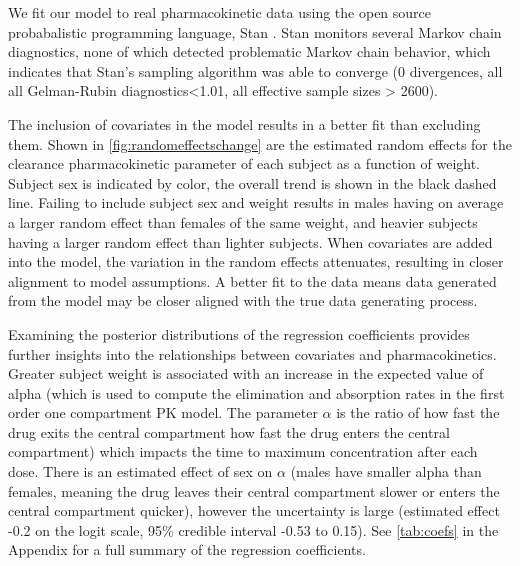 We fit our model to real pharmacokinetic data using the open source probabalistic programming language, Stan \cite{gelman2015stan}.  Stan monitors several Markov chain diagnostics, none of which detected problematic Markov chain behavior, which indicates that Stan’s sampling algorithm was able to converge (0 divergences, all all Gelman-Rubin diagnostics<1.01, all effective sample sizes  > 2600).  

The inclusion of covariates in the model results in a better fit than excluding them. Shown in \cref{fig:randomeffectschange} are the estimated random effects for the clearance pharmacokinetic parameter of each subject as a function of weight.  Subject sex is indicated by color, the overall trend is shown in the black dashed line.  Failing to include subject sex and weight results in males having on average a larger random effect than females of the same weight, and heavier subjects having a larger random effect than lighter subjects.  When covariates are added into the model, the variation in the random effects attenuates, resulting in closer alignment to model assumptions. A better fit to the data means data generated from the model may be closer aligned with the true data generating process.

Examining the posterior distributions of the regression coefficients provides further insights into the relationships between covariates and pharmacokinetics. Greater subject weight is associated with an increase in the expected value of alpha (which is used to compute the elimination and absorption rates in the first order one compartment PK model.  The parameter $ \alpha $ is the ratio of how fast the drug exits the central compartment  how fast the drug enters the central compartment) which impacts the time to maximum concentration after each dose.  There is an estimated effect of sex on $ \alpha $ (males have smaller alpha than females, meaning the drug leaves their central compartment slower or enters the central compartment quicker), however the uncertainty is large (estimated effect -0.2 on the logit scale, 95\% credible interval -0.53 to 0.15). See \cref{tab:coefs} in the Appendix for a full summary of the regression coefficients.




